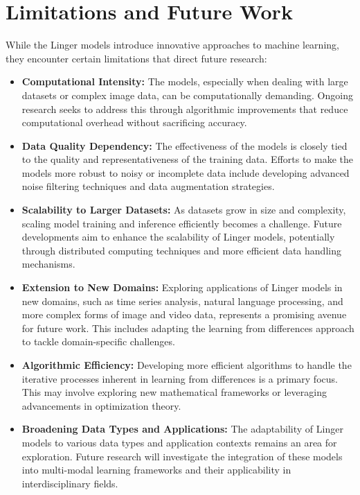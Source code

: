 \documentclass[a4paper, 12pt]{report}
\begin{document}
\section{Limitations and Future Work}
\label{sec:limitiations_future_work}
While the Linger models introduce innovative approaches to machine learning, they encounter certain limitations 
that direct future research:
\begin{itemize}
    \item \textbf{Computational Intensity:} The models, especially when dealing with large datasets or complex image data, can be 
    computationally demanding. Ongoing research seeks to address this through algorithmic improvements that reduce computational 
    overhead without sacrificing accuracy.
    \item \textbf{Data Quality Dependency:} The effectiveness of the models is closely tied to the quality and representativeness of the 
    training data. Efforts to make the models more robust to noisy or incomplete data include developing advanced noise filtering techniques 
    and data augmentation strategies.
    \item \textbf{Scalability to Larger Datasets:} As datasets grow in size and complexity, scaling model training and inference efficiently 
    becomes a challenge. Future developments aim to enhance the scalability of Linger models, potentially through distributed computing techniques 
    and more efficient data handling mechanisms.
    \item \textbf{Extension to New Domains:} Exploring applications of Linger models in new domains, such as time series analysis, natural 
    language processing, and more complex forms of image and video data, represents a promising avenue for future work. This includes adapting the 
    learning from differences approach to tackle domain-specific challenges.
    \item \textbf{Algorithmic Efficiency:} Developing more efficient algorithms to handle the iterative processes inherent in learning from 
    differences is a primary focus. This may involve exploring new mathematical frameworks or leveraging advancements in optimization theory.
    \item \textbf{Broadening Data Types and Applications:} The adaptability of Linger models to various data types and application contexts 
    remains an area for exploration. Future research will investigate the integration of these models into multi-modal learning frameworks 
    and their applicability in interdisciplinary fields.
\end{itemize}
\end{document}
